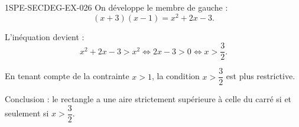 \begin{corrige}{1SPE-SECDEG-EX-026}
On développe le membre de gauche :
\[(x+3)(x-1) = x^2 + 2x - 3.\]

L'inéquation devient :
\[x^2 + 2x - 3 > x^2 \iff 2x - 3 > 0 \iff x > \frac{3}{2}.\]


En tenant compte de la contrainte $x > 1$, la condition $x > \dfrac{3}{2}$ est plus restrictive.

Conclusion : le rectangle a une aire strictement supérieure à celle du carré si et seulement si $x > \dfrac{3}{2}$.

\end{corrige}
